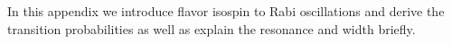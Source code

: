 


In this appendix we introduce flavor isospin \cite{Duan2006a} to Rabi oscillations and derive the transition probabilities as well as explain the resonance and width briefly.



